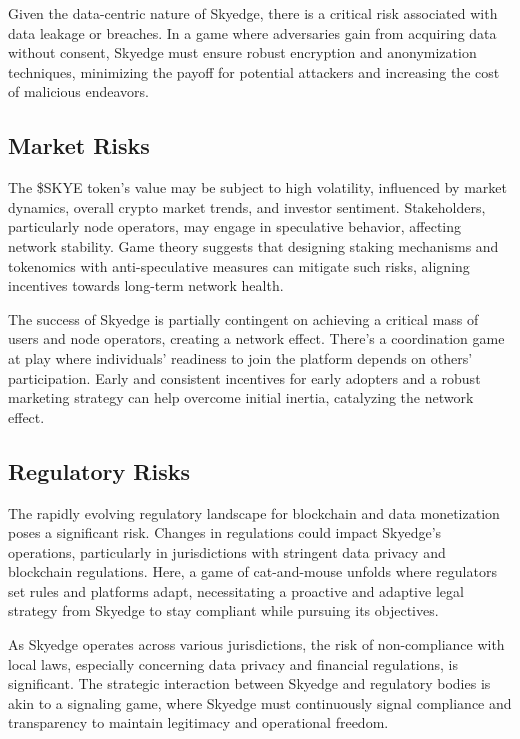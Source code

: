 \documentclass{article}
\begin{document}
Given the data-centric nature of Skyedge, there is a critical risk associated with data leakage or breaches. In a game where adversaries gain from acquiring data without consent, Skyedge must ensure robust encryption and anonymization techniques, minimizing the payoff for potential attackers and increasing the cost of malicious endeavors.

\subsection{Market Risks}

The \$SKYE token's value may be subject to high volatility, influenced by market dynamics, overall crypto market trends, and investor sentiment. Stakeholders, particularly node operators, may engage in speculative behavior, affecting network stability. Game theory suggests that designing staking mechanisms and tokenomics with anti-speculative measures can mitigate such risks, aligning incentives towards long-term network health.

The success of Skyedge is partially contingent on achieving a critical mass of users and node operators, creating a network effect. There's a coordination game at play where individuals' readiness to join the platform depends on others' participation. Early and consistent incentives for early adopters and a robust marketing strategy can help overcome initial inertia, catalyzing the network effect.

\subsection{Regulatory Risks}
The rapidly evolving regulatory landscape for blockchain and data monetization poses a significant risk. Changes in regulations could impact Skyedge's operations, particularly in jurisdictions with stringent data privacy and blockchain regulations. Here, a game of cat-and-mouse unfolds where regulators set rules and platforms adapt, necessitating a proactive and adaptive legal strategy from Skyedge to stay compliant while pursuing its objectives.

As Skyedge operates across various jurisdictions, the risk of non-compliance with local laws, especially concerning data privacy and financial regulations, is significant. The strategic interaction between Skyedge and regulatory bodies is akin to a signaling game, where Skyedge must continuously signal compliance and transparency to maintain legitimacy and operational freedom.
\end{document}
